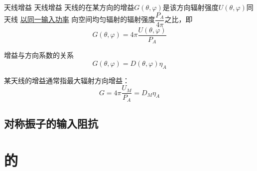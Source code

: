         \begin{definition}
        {天线增益}
        {天线增益}
            天线的在某方向的增益$G(\theta,\varphi)$是该方向辐射强度$U(\theta,\varphi)$同天线 \underline{以同一输入功率} 向空间均匀辐射的辐射强度$\dfrac{P_A}{4\pi}$之比，即
            \begin{equation}
                G(\theta,\varphi)=4\pi \frac{U(\theta,\varphi)}{P_A}
            \end{equation}

            增益与方向系数的关系
            \begin{equation}
                G(\theta,\varphi)=D(\theta,\varphi)\eta_A
            \end{equation}

            某天线的增益通常指最大辐射方向增益：
            \begin{equation}
                G=4\pi \frac{U_M}{P_A}=D_M\eta_A
            \end{equation}
        \end{definition}

        
    \subsection{对称振子的输入阻抗}
    
\section{的}
